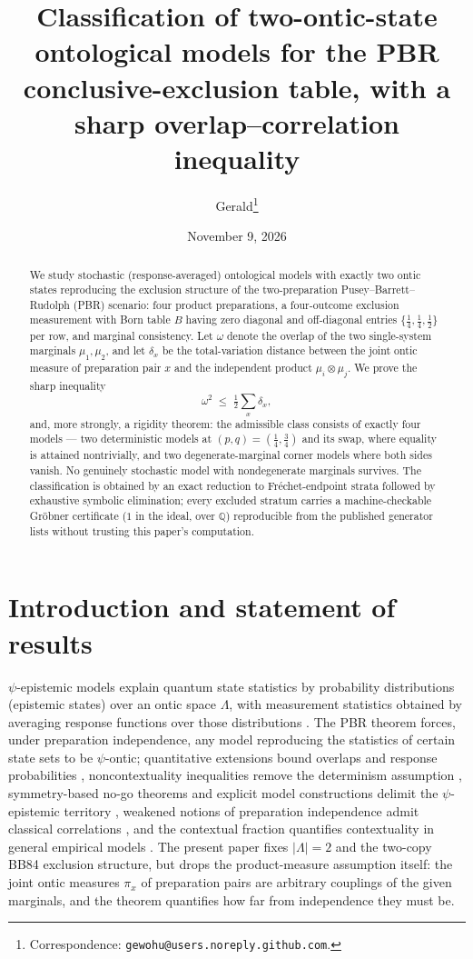 \documentclass[11pt,a4paper]{article}
\title{\bf Classification of two-ontic-state ontological models for the PBR conclusive-exclusion table, with a sharp overlap--correlation inequality}
\author{Gerald\thanks{Correspondence: \texttt{gewohu@users.noreply.github.com}.}}
\date{November 9, 2026}
\newcommand{\dd}{\delta}
\begin{document}
\maketitle
\begin{center}\end{center}

\begin{abstract}
We study stochastic (response-averaged) ontological models with exactly two ontic states reproducing the exclusion structure of the two-preparation Pusey--Barrett--Rudolph (PBR) scenario: four product preparations, a four-outcome exclusion measurement with Born table $B$ having zero diagonal and off-diagonal entries $\{\tfrac14,\tfrac14,\tfrac12\}$ per row, and marginal consistency. Let $\omega$ denote the overlap of the two single-system marginals $\mu_1,\mu_2$, and let $\dd_x$ be the total-variation distance between the joint ontic measure of preparation pair $x$ and the independent product $\mu_i\otimes\mu_j$. We prove the sharp inequality
\[
\omega^2 \;\le\; \tfrac12\sum_x \dd_x ,
\]
and, more strongly, a rigidity theorem: the admissible class consists of exactly four models --- two deterministic models at $(p,q)=(\tfrac14,\tfrac34)$ and its swap, where equality is attained nontrivially, and two degenerate-marginal corner models where both sides vanish. No genuinely stochastic model with nondegenerate marginals survives. The classification is obtained by an exact reduction to Fr\'echet-endpoint strata followed by exhaustive symbolic elimination; every excluded stratum carries a machine-checkable Gr\"obner certificate ($1$ in the ideal, over $\mathbb{Q}$) reproducible from the published generator lists without trusting this paper's computation.
\end{abstract}

\section{Introduction and statement of results}
$\psi$-epistemic models explain quantum state statistics by probability distributions (epistemic states) over an ontic space $\Lambda$, with measurement statistics obtained by averaging response functions over those distributions \cite{harriganspekkens}. The PBR theorem \cite{pbr} forces, under preparation independence, any model reproducing the statistics of certain state sets to be $\psi$-ontic; quantitative extensions bound overlaps and response probabilities \cite{branciard}, noncontextuality inequalities remove the determinism assumption \cite{ks2}, symmetry-based no-go theorems and explicit model constructions delimit the $\psi$-epistemic territory \cite{aaronson}, weakened notions of preparation independence admit classical correlations \cite{mansfield}, and the contextual fraction quantifies contextuality in general empirical models \cite{abramsky}. The present paper fixes $|\Lambda|=2$ and the two-copy BB84 exclusion structure, but drops the product-measure assumption itself: the joint ontic measures $\pi_x$ of preparation pairs are arbitrary couplings of the given marginals, and the theorem quantifies how far from independence they must be.
\end{document}
